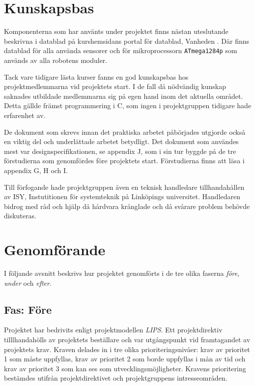 \documentclass[11pt]{article}
\begin{document}
\begin{flushleft}
\pagebreak

\section{Kunskapsbas}
Komponenterna som har använts under projektet finns nästan uteslutande beskrivna i datablad på kurshemsidans portal för datablad, Vanheden \cite{hemsidan}. Där finns datablad för alla använda sensorer och för mikroprocessorn \verb+ATmega1284p+ som används av alla robotens moduler.

Tack vare tidigare lästa kurser fanns en god kunskapsbas hos projektmedlemmarna vid projektets start. I de fall då nödvändig kunskap saknades utbildade medlemmarna sig på egen hand inom det aktuella området. Detta gällde främst programmering i C, som ingen i projektgruppen tidigare hade erfarenhet av. 

De dokument som skrevs innan det praktiska arbetet påbörjades utgjorde också en viktig del och underlättade arbetet betydligt. Det dokument som användes mest var designspecifikationen, se appendix J, som i sin tur byggde på de tre förstudierna som genomfördes före projektets start. Förstudierna finns att läsa i appendix G, H och I.

Till förfogande hade projektgruppen även en teknisk handledare tillhandahållen av ISY, Instutitionen för systemteknik på Linköpings universitet. Handledaren bidrog med råd och hjälp då hårdvara krånglade och då svårare problem behövde diskuteras.

\pagebreak

\section{Genomförande}
I följande avsnitt beskrivs hur projektet genomförts i de tre olika faserna \textit{före}, \textit{under} och \textit{efter}.

\subsection{Fas: Före}
Projektet har bedrivits enligt projektmodellen \textit{LIPS}. \cite{LIPS} Ett projektdirektiv tilllhandahölls av projektets beställare och var utgångspunkt vid framtagandet av projektets krav. Kraven delades in i tre olika prioriteringsnivåer: krav av prioritet 1 som måste uppfyllas, krav av prioritet 2 som borde uppfyllas i mån av tid och krav av prioritet 3 som kan ses som utvecklingsmöjligheter. Kravens prioritering bestämdes utifrån projektdirektivet och projektgruppens intresseområden. 


\end{flushleft}
\end{document}
